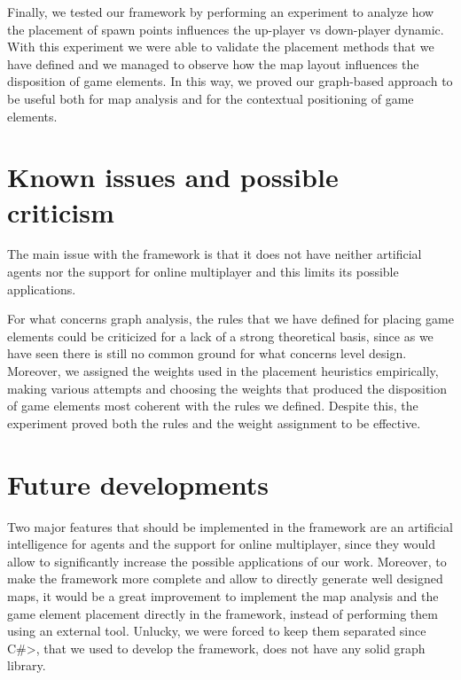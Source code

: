 \par

Finally, we tested our framework by performing an experiment to analyze how the placement of spawn points influences the up-player vs down-player dynamic. With this experiment we were able to validate the placement methods that we have defined and we managed to observe how the map layout influences the disposition of game elements. In this way, we proved our graph-based approach to be useful both for map analysis and for the contextual positioning of game elements.


\section{Known issues and possible criticism}

The main issue with the framework is that it does not have neither artificial agents nor the support for online multiplayer and this limits its possible applications.

\par

For what concerns graph analysis, the rules that we have defined for placing game elements could be criticized for a lack of a strong theoretical basis, since as we have seen there is still no common ground for what concerns level design. Moreover, we assigned the weights used in the placement heuristics empirically, making various attempts and choosing the weights that produced the disposition of game elements most coherent with the rules we defined. Despite this, the experiment proved both the rules and the weight assignment to be effective.


\section{Future developments}

Two major features that should be implemented in the framework are an artificial intelligence for agents and the support for online multiplayer, since they would allow to significantly increase the possible applications of our work. Moreover, to make the framework more complete and allow to directly generate well designed maps, it would be a great improvement to implement the map analysis and the game element placement directly in the framework, instead of performing them using an external tool. Unlucky, we were forced to keep them separated since \<C\#>, that we used to develop the framework, does not have any solid graph library.

